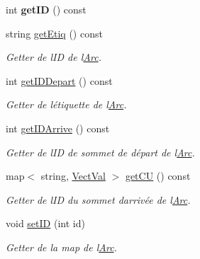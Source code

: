 \begin{DoxyCompactItemize}
int {\bfseries get\+ID} () const
\item 
\mbox{\label{classArc_ad5504ac39296e1ba2fd900900ce8bfb5}} 
string \hyperlink{classArc_ad5504ac39296e1ba2fd900900ce8bfb5}{get\+Etiq} () const
\begin{DoxyCompactList}\small\item\em Getter de l\textquotesingle{}ID de l\textquotesingle{}\hyperlink{classArc}{Arc}. \end{DoxyCompactList}\item 
\mbox{\label{classArc_a93e0fce8985ca63e09e43334caa6626d}} 
int \hyperlink{classArc_a93e0fce8985ca63e09e43334caa6626d}{get\+I\+D\+Depart} () const
\begin{DoxyCompactList}\small\item\em Getter de l\textquotesingle{}\'{e}tiquette de l\textquotesingle{}\hyperlink{classArc}{Arc}. \end{DoxyCompactList}\item 
\mbox{\label{classArc_a2ed8f6e7db6f247b3e04fda1e5248ca7}} 
int \hyperlink{classArc_a2ed8f6e7db6f247b3e04fda1e5248ca7}{get\+I\+D\+Arrive} () const
\begin{DoxyCompactList}\small\item\em Getter de l\textquotesingle{}ID de sommet de d\'{e}part de l\textquotesingle{}\hyperlink{classArc}{Arc}. \end{DoxyCompactList}\item 
\mbox{\label{classArc_a3faaa05e527590a4c18ebd574c0ee6f6}} 
map$<$ string, \hyperlink{structVectVal}{Vect\+Val} $>$ \hyperlink{classArc_a3faaa05e527590a4c18ebd574c0ee6f6}{get\+CU} () const
\begin{DoxyCompactList}\small\item\em Getter de l\textquotesingle{}ID du sommet d\textquotesingle{}arriv\'{e}e de l\textquotesingle{}\hyperlink{classArc}{Arc}. \end{DoxyCompactList}\item 
\mbox{\label{classArc_a5cb77d9a1870a8a29962118d47be163f}} 
void \hyperlink{classArc_a5cb77d9a1870a8a29962118d47be163f}{set\+ID} (int id)
\begin{DoxyCompactList}\small\item\em Getter de la map de l\textquotesingle{}\hyperlink{classArc}{Arc}. \end{DoxyCompactList}\item 

\end{DoxyCompactItemize}
